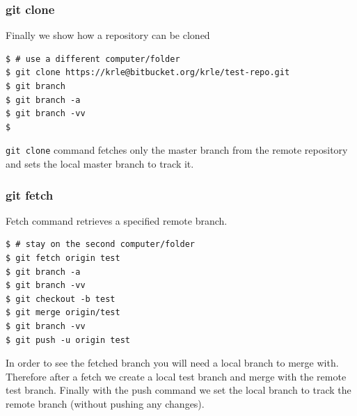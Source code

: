 \documentclass{beamer}
\begin{document}










\begin{frame}[fragile]
\frametitle{git clone}

Finally we show how a repository can be cloned

\begin{lstlisting}
$ # use a different computer/folder
$ git clone https://krle@bitbucket.org/krle/test-repo.git
$ git branch
$ git branch -a
$ git branch -vv
$ 
\end{lstlisting}

\texttt{git clone} command fetches only the master branch from the remote
repository and sets the local master branch to track it.

\end{frame}


\begin{frame}[fragile]
\frametitle{git fetch}

Fetch command retrieves a specified remote branch.

\begin{lstlisting}
$ # stay on the second computer/folder
$ git fetch origin test
$ git branch -a
$ git branch -vv
$ git checkout -b test
$ git merge origin/test
$ git branch -vv
$ git push -u origin test
\end{lstlisting}

In order to see the fetched branch you will need a local branch to
merge with. Therefore after a fetch we create a local test branch and
merge with the remote test branch. Finally with the push command we
set the local branch to track the remote branch (without pushing any
changes).


\end{frame}
\end{document}
